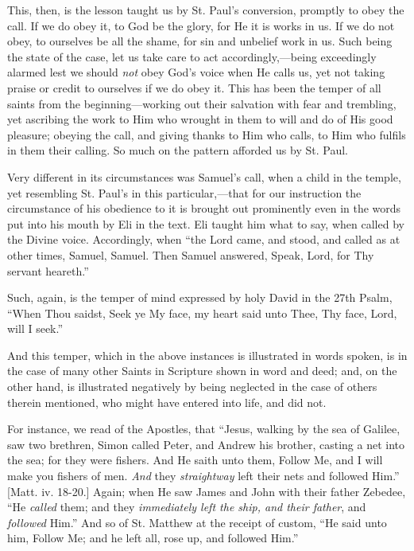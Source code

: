This, then, is the lesson taught us by St. Paul's conversion,
promptly to obey the call. If we do obey it, to God be the glory, for
He it is works in us. If we do not obey, to ourselves be all the
shame, for sin and unbelief work in us. Such being the state of the
case, let us take care to act accordingly,—being exceedingly alarmed
lest we should \emph{not} obey God's voice when He calls us, yet not
taking praise or credit to ourselves if we do obey it. This has been
the temper of all saints from the beginning—working out their
salvation with fear and trembling, yet ascribing the work to Him who
wrought in them to will and do of His good pleasure; obeying the call,
and giving thanks to Him who calls, to Him who fulfils in them their
calling. So much on the pattern afforded us by St. Paul.

Very different in its circumstances was Samuel's call, when a child
in the temple, yet resembling St. Paul's in this particular,—that
for our instruction the circumstance of his obedience to it is brought
out prominently even in the words put into his mouth by Eli in the
text. Eli taught him what to say, when called by the Divine voice.
Accordingly, when ``the Lord came, and stood, and called as at
other times, Samuel, Samuel. Then Samuel answered, Speak, Lord, for
Thy servant heareth.''

Such, again, is the temper of mind expressed by holy David in the
27th Psalm, ``When Thou saidst, Seek ye My face, my heart said
unto Thee, Thy face, Lord, will I seek.''

And this temper, which in the above instances is illustrated in
words spoken, is in the case of many other Saints in Scripture shown
in word and deed; and, on the other hand, is illustrated negatively by
being neglected in the case of others therein mentioned, who might
have entered into life, and did not.

For instance, we read of the Apostles, that ``Jesus, walking by
the sea of Galilee, saw two brethren, Simon called Peter, and Andrew
his brother, casting a net into the sea; for they were fishers. And He
saith unto them, Follow Me, and I will make you fishers of men. \emph{And}
they \emph{straightway} left their nets and followed Him.'' [Matt.
iv. 18-20.] Again; when He saw James and John with their father
Zebedee, ``He \emph{called} them; and they \emph{immediately left the
ship, and their father}, and \emph{followed} Him.'' And so of
St. Matthew at the receipt of custom, ``He said unto him, Follow
Me; and he left all, rose up, and followed Him.''

